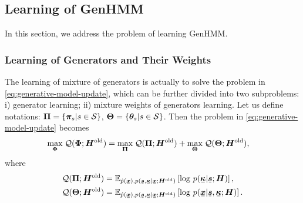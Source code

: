 \subsection{Learning of GenHMM}\label{subsec:optmGenHMM}
In this section, we address the problem of learning GenHMM.
\subsubsection{Learning of Generators and Their Weights}
The learning of mixture of generators is actually to solve the problem in \eqref{eq:generative-model-update}, which can be further divided into two subproblems: i) generator learning; ii) mixture weights of generators learning. Let us define notations:
$\bm{\Pi} = \left\{  \bm{\pi}_{s}| s\in \mathcal{S} \right\}$, $\bm{\Theta}=\left\{ \bm{\theta}_s| s\in \mathcal{S} \right\}$. 
Then the problem in \eqref{eq:generative-model-update} becomes
\begin{align}\label{eq:sub-gm}
  &\underset{\bm{\Phi}}{\max}\; \mathcal{Q}(\bm{\Phi}; \bm{H}^{\mathrm{old}}) = \underset{\bm{\Pi}}{\max}\; \mathcal{Q}(\bm{\Pi}; \bm{H}^{\mathrm{old}}) + \underset{\bm{\Theta}}{\max}\; \mathcal{Q}(\bm{\Theta}; \bm{H}^{\mathrm{old}}),
\end{align}
where
\begin{align}
  \Qq(\bm{\Pi}; \bm{H}^{\mathrm{old}})  &=\EE_{\hat{p}(\ubm{x}),p(\ubm{s},\ubm{\kappa}| \ubm{x}; \bm{H}^{\mathrm{old}})}\left[  \log\,p(\ubm{\kappa}| \ubm{s}; \bm{H})\right], \\
  \Qq(\bm{\Theta}; \bm{H}^{\mathrm{old}}) &=\EE_{\hat{p}(\ubm{x}),p(\ubm{s},\ubm{\kappa}| \ubm{x}; \bm{H}^{\mathrm{old}})}\left[  \log\,p(\ubm{x}| \ubm{s},\ubm{\kappa}; \bm{H})\right].
\end{align}

